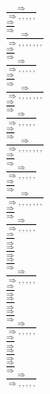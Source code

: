 \documentclass[11pt]{article}
\begin{document}
\begin{center}
\bigskip
\\$\frac{\Rightarrow }{\Rightarrow , , , , , }$
\bigskip
\\$\frac{\Rightarrow }{\Rightarrow }$
\bigskip
\\$\frac{\Rightarrow }{\Rightarrow , , , , , , , }$
\bigskip
\\$\frac{\Rightarrow }{\Rightarrow }$
\bigskip
\\$\frac{\Rightarrow }{\Rightarrow , , , , , }$
\bigskip
\\$\frac{\Rightarrow }{\Rightarrow }$
\bigskip
\\$\frac{\Rightarrow }{\Rightarrow , , , , , , , }$
\bigskip
\\$\frac{\Rightarrow }{\Rightarrow }$
\bigskip
\\$\frac{\Rightarrow }{\Rightarrow , , , , , }$
\bigskip
\\$\frac{\Rightarrow }{\Rightarrow }$
\bigskip
\\$\frac{\Rightarrow }{\Rightarrow , , , , , , , }$
\bigskip
\\$\frac{\Rightarrow }{\Rightarrow }$
\bigskip
\\$\frac{\Rightarrow }{\Rightarrow , , , , , }$
\bigskip
\\$\frac{\Rightarrow }{\Rightarrow }$
\bigskip
\\$\frac{\Rightarrow }{\Rightarrow , , , , , , , }$
\bigskip
\\$\frac{\Rightarrow }{\Rightarrow }$
\bigskip
\\$\frac{\Rightarrow }{\Rightarrow , , , , , }$
\bigskip
\\$\frac{\Rightarrow }{\Rightarrow }$
\bigskip
\\$\frac{\Rightarrow }{\Rightarrow }$
\bigskip
\\$\frac{\Rightarrow }{\Rightarrow }$
\bigskip
\\$\frac{\Rightarrow }{\Rightarrow , , , , , }$
\bigskip
\\$\frac{\Rightarrow }{\Rightarrow }$
\bigskip
\\$\frac{\Rightarrow }{\Rightarrow }$
\bigskip
\\$\frac{\Rightarrow }{\Rightarrow }$
\bigskip
\\$\frac{\Rightarrow }{\Rightarrow , , , , , }$
\bigskip
\\$\frac{\Rightarrow }{\Rightarrow }$
\bigskip
\\$\frac{\Rightarrow }{\Rightarrow }$
\bigskip
\\$\frac{\Rightarrow }{\Rightarrow }$
\bigskip
\\$\frac{\Rightarrow }{\Rightarrow , , , , , }$

\end{center}
\end{document}
